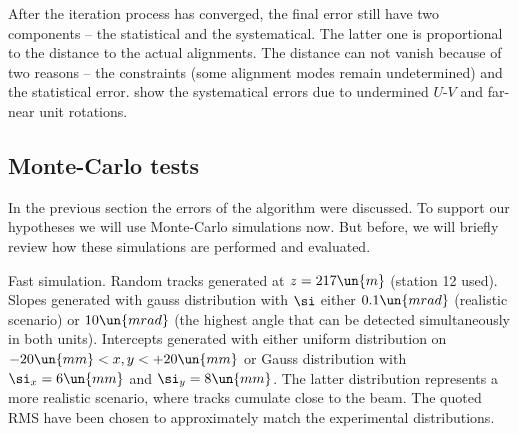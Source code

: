 After the iteration process has converged, the final error still have two components -- the statistical and the systematical. The latter one is proportional to the distance to the actual alignments. The distance can not vanish because of two reasons -- the constraints (some alignment modes remain undetermined) and the statistical error.  show the systematical errors due to undermined $U$-$V$ and far-near unit rotations. 




\subsection[al mc tests]{Monte-Carlo tests}


In the previous section the errors of the algorithm were discussed. To support our hypotheses we will use Monte-Carlo simulations now. But before, we will briefly review how these simulations are performed and evaluated.

Fast simulation. Random tracks generated at $z=217\un{m}$ (station 12 used). Slopes generated with gauss distribution with $\si$ either $0.1\un{mrad}$ (realistic scenario) or $10\un{mrad}$ (the highest angle that can be detected simultaneously in both units). Intercepts generated with either uniform distribution on $ -20\un{mm} < x, y < +20\un{mm}$ or Gauss distribution with $\si_x = 6\un{mm}$ and $\si_y = 8\un{mm}$. The latter distribution represents a more realistic scenario, where tracks cumulate close to the beam. The quoted RMS have been chosen to approximately match the experimental distributions.

